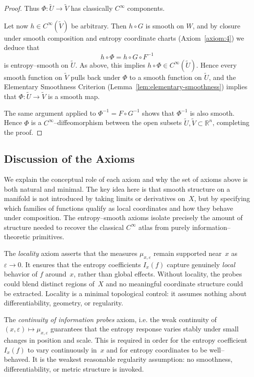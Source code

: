 \documentclass[11pt]{amsart}
\theoremstyle{definition}
\theoremstyle{remark}
\begin{document}
\begin{proof}
Thus $\Phi:\widetilde U\to\widetilde V$ has classically
$C^\infty$ components.

Let now $h \in C^\infty(\widetilde V)$ be arbitrary. Then $h\circ G$ is smooth on $W$, and
by closure under smooth composition and entropy coordinate charts (Axiom~\ref{axiom:4})
we deduce that
\[
h\circ\Phi = h\circ G \circ F^{-1}
\]
is entropy–smooth on $\widetilde U$. As above, this implies $h\circ\Phi\in C^\infty(\widetilde U)$.
Hence every smooth function on $\widetilde V$ pulls back under $\Phi$ to a smooth function
on $\widetilde U$, and the Elementary Smoothness Criterion
(Lemma~\ref{lem:elementary-smoothness}) implies that $\Phi:\widetilde U\to\widetilde V$ is a
smooth map.

The same argument applied to $\Phi^{-1} = F\circ G^{-1}$ shows that $\Phi^{-1}$ is
also smooth. Hence $\Phi$ is a $C^\infty$–diffeomorphism between the open subsets
$\widetilde U,\widetilde V\subset\mathbb{R}^n$, completing the proof.
\end{proof}


\subsection{Discussion of the Axioms}

We explain the conceptual role of each axiom and why the set of axioms above is
both natural and minimal.  The key idea here is that smooth structure on a
manifold is not introduced by taking limits or derivatives on~$X$, but by
specifying which families of functions qualify as local coordinates and
how they behave under composition.  The entropy--smooth axioms isolate
precisely the amount of structure needed to recover the classical
$C^\infty$ atlas from purely information--theoretic primitives.

The \emph{locality} axiom asserts that the measures $\mu_{x,\varepsilon}$ remain
supported near~$x$ as $\varepsilon\to 0$.  It ensures that the entropy
coefficients $I_x(f)$ capture genuinely \emph{local} behavior of $f$
around~$x$, rather than global effects.  Without locality, the probes could
blend distinct regions of~$X$ and no meaningful coordinate structure could
be extracted.  Locality is a minimal topological control: it assumes
nothing about differentiability, geometry, or regularity.

The \emph{continuity of information probes} axiom, i.e. the weak continuity of $(x,\varepsilon)\mapsto\mu_{x,\varepsilon}$
guarantees that the entropy response varies stably under small changes in
position and scale.  This is required in order for the entropy coefficient
$I_x(f)$ to vary continuously in~$x$ and for entropy coordinates to be
well--behaved.  It is the weakest reasonable regularity assumption: no
smoothness, differentiability, or metric structure is invoked.
\end{document}
